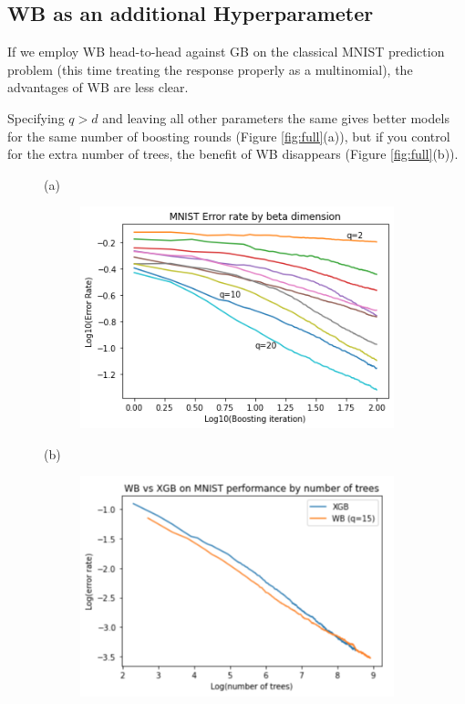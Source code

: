 \documentclass{article}
\begin{document}
\subsection{WB as an additional Hyperparameter}

If we employ WB head-to-head against GB on the classical MNIST prediction problem (this time treating the response properly as a multinomial), the advantages of WB are less clear.

Specifying $q > d$ and leaving all other parameters the same gives better models for the same number of boosting rounds (Figure \ref{fig:full}(a)), but if you control for the extra number of trees, the benefit of WB disappears (Figure \ref{fig:full}(b)).

\begin{figure}[h]
    (a)
    \begin{subfigure}[b]{0.45\textwidth}
         \centering
         \includegraphics[width=\textwidth]{mnist_loglog.png}
         \label{fig:a}
    \end{subfigure}
    \hfill
    (b)
    \begin{subfigure}[b]{0.45\textwidth}
         \centering
         \includegraphics[width=\textwidth]{mnist_ntree.png}

\end{subfigure}
\end{figure}
\end{document}
